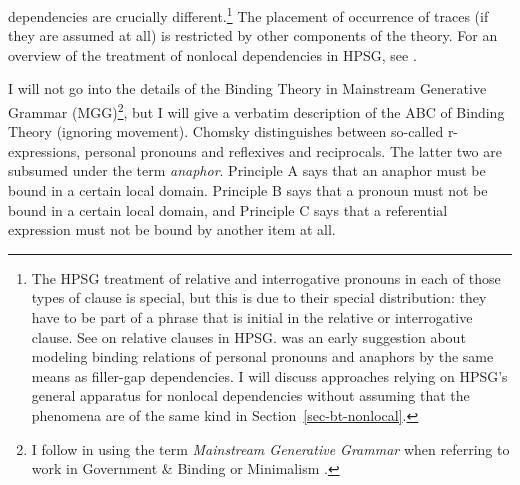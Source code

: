 \documentclass[output=paper,biblatex,babelshorthands,newtxmath,draftmode,colorlinks,citecolor=brown]{langscibook}
\begin{document}
dependencies are crucially different.\footnote{\label{binding-fn-percolation-of-indices}%
The HPSG treatment of relative and interrogative pronouns in each of those types of clause is special, but this
is due to their special distribution: they have to be part of a phrase that is initial in the
relative or interrogative clause. 
See  on relative
clauses in HPSG. %
 was an early suggestion about modeling binding relations of personal pronouns and anaphors by
the same means as filler-gap dependencies. I will discuss approaches relying on HPSG's general apparatus
for nonlocal dependencies without assuming that the phenomena are of the same kind in Section~\ref{sec-bt-nonlocal}. 
} The placement of occurrence of traces (if they are assumed at all)
is restricted by other components of the theory. For an overview of the treatment of nonlocal
dependencies in HPSG, see .

I will not go into the details of the Binding Theory in Mainstream Generative Grammar
(MGG)\footnote{
I follow \citet[]{CJ2005a} in using the term \emph{Mainstream Generative Grammar} when
referring to work in Government \& Binding\indexgb \citep{Chomsky81a} or Minimalism \citep{Chomsky95a-u}.}, but I will
give a verbatim description of the ABC of Binding Theory (ignoring movement). Chomsky distinguishes between
so-called r-expressions, personal
pronouns and reflexives and reciprocals. The latter two are subsumed under the term \emph{anaphor}. 
Principle A says that an anaphor must be bound in a certain local domain. Principle B says that a
pronoun must not be bound in a certain local domain, and Principle C says that a referential
expression must not be bound by another item at all.
\end{document}
